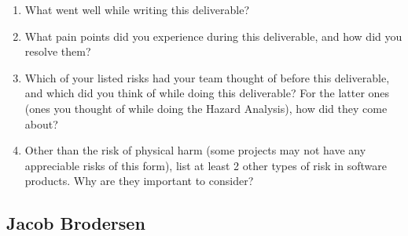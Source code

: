 \documentclass{article}
\begin{document}


\begin{enumerate}
    \item What went well while writing this deliverable? 
    \item What pain points did you experience during this deliverable, and how
    did you resolve them?
    \item Which of your listed risks had your team thought of before this
    deliverable, and which did you think of while doing this deliverable? For
    the latter ones (ones you thought of while doing the Hazard Analysis), how
    did they come about?
    \item Other than the risk of physical harm (some projects may not have any
    appreciable risks of this form), list at least 2 other types of risk in
    software products. Why are they important to consider?
\end{enumerate}

\subsection*{Jacob Brodersen}
\end{document}
